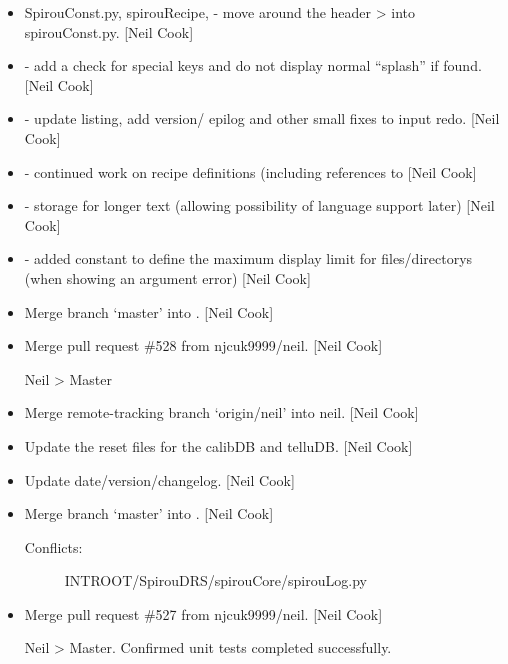 \documentclass[a4paper,10pt,english]{report}
\begin{document}
\label{\detokenize{misc/changelog:id221}}\begin{itemize}
\item {} 
SpirouConst.py, spirouRecipe,  - move around the
header \textendash{}\textgreater{} into spirouConst.py. {[}Neil Cook{]}

\item {} 
 - add a check for special keys and do not display
normal “splash” if found. {[}Neil Cook{]}

\item {} 
 - update listing, add version/ epilog and other small
fixes to input redo. {[}Neil Cook{]}

\item {} 
 - continued work on recipe definitions (including
references to  {[}Neil Cook{]}

\item {} 
 - storage for longer text (allowing possibility
of language support later) {[}Neil Cook{]}

\item {} 
 - added constant to define the maximum display limit
for files/directorys (when showing an argument error) {[}Neil Cook{]}

\item {} 
Merge branch ‘master’ into . {[}Neil Cook{]}

\item {} 
Merge pull request \#528 from njcuk9999/neil. {[}Neil Cook{]}

Neil \textendash{}\textgreater{} Master

\item {} 
Merge remote-tracking branch ‘origin/neil’ into neil. {[}Neil Cook{]}

\item {} 
Update the reset files for the calibDB and telluDB. {[}Neil Cook{]}

\item {} 
Update date/version/changelog. {[}Neil Cook{]}

\item {} 
Merge branch ‘master’ into . {[}Neil Cook{]}
\begin{description}
\item[{Conflicts:}] \leavevmode
INTROOT/SpirouDRS/spirouCore/spirouLog.py

\end{description}

\item {} 
Merge pull request \#527 from njcuk9999/neil. {[}Neil Cook{]}

Neil \textendash{}\textgreater{} Master. Confirmed unit tests completed successfully.

\end{itemize}
\end{document}
